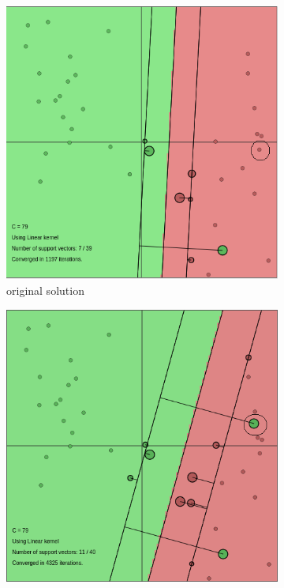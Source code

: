 \documentclass{article}
\begin{document}
\begin{figure}[]
		\begin{subfigure}{0.33\linewidth}
            \includegraphics[width=\linewidth]{add3}
            \caption{original solution}
        \end{subfigure}
        \begin{subfigure}{0.33\linewidth}
            \includegraphics[width=\linewidth]{add4}

\end{subfigure}
\end{figure}
\end{document}
